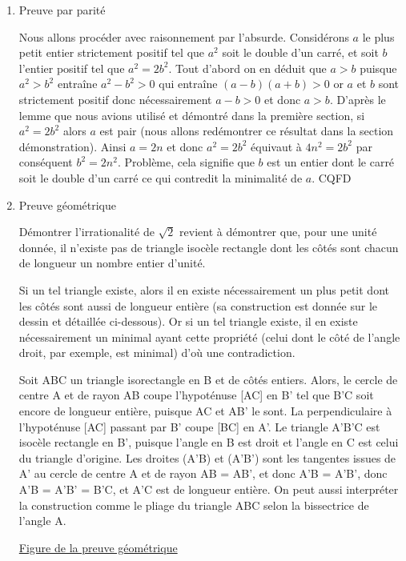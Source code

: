 \documentclass[a4paper, 11pt, twoside]{article}
\begin{document}
\begin{enumerate}
\item Preuve par parité
\label{sec:orgd5e76ab}

Nous allons procéder avec raisonnement par l'absurde. Considérons
\(a\) le plus petit entier strictement positif tel que \(a^2\) soit
le double d'un carré, et soit \(b\) l'entier positif tel que \(a^2 =
     2b^2\). Tout d'abord on en déduit que \(a > b\) puisque \(a^2 > b^2\)
entraîne \(a^2 - b^2 > 0\) qui entraîne \((a - b)(a + b) > 0\) or \(a\)
et \(b\) sont strictement positif donc nécessairement \(a - b > 0\)
et donc \(a > b\). D'après le lemme que nous avions utilisé et
démontré dans la première section, si \(a^2 = 2b^2\) alors \(a\) est
pair (nous allons redémontrer ce résultat dans la section
démonstration). Ainsi \(a = 2n\) et donc \(a^2 = 2b^2\) équivaut à
\(4n^2 = 2b^2\) par conséquent \(b^2 = 2n^2\). Problème, cela
signifie que \(b\) est un entier dont le carré soit le double d'un
carré ce qui contredit la minimalité de \(a\). CQFD


\item Preuve géométrique
\label{sec:orgd384ad9}


Démontrer l'irrationalité de \(\sqrt{2}\) revient à démontrer que,
pour une unité donnée, il n'existe pas de triangle isocèle
rectangle dont les côtés sont chacun de longueur un nombre entier
d'unité.

Si un tel triangle existe, alors il en existe nécessairement un
plus petit dont les côtés sont aussi de longueur entière (sa
construction est donnée sur le dessin et détaillée
ci-dessous). Or si un tel triangle existe, il en existe
nécessairement un minimal ayant cette propriété (celui dont le
côté de l'angle droit, par exemple, est minimal) d'où une
contradiction.

Soit ABC un triangle isorectangle en B et de côtés
entiers. Alors, le cercle de centre A et de rayon AB coupe
l'hypoténuse [AC] en B' tel que B'C soit encore de longueur
entière, puisque AC et AB' le sont. La perpendiculaire à
l'hypoténuse [AC] passant par B' coupe [BC] en A'. Le triangle
A'B'C est isocèle rectangle en B', puisque l'angle en B est droit
et l'angle en C est celui du triangle d'origine. Les droites
(A'B) et (A'B') sont les tangentes issues de A' au cercle de
centre A et de rayon AB = AB', et donc A'B = A'B', donc A'B =
A'B' = B'C, et A'C est de longueur entière. On peut aussi
interpréter la construction comme le pliage du triangle ABC selon
la bissectrice de l'angle A.

\href{https://drive.google.com/file/d/1CpRr1jzHiOtFnYS10NL7yp9OSMSFNeU5/view?usp=sharing}{Figure de la preuve géométrique}
\end{enumerate}
\end{document}

